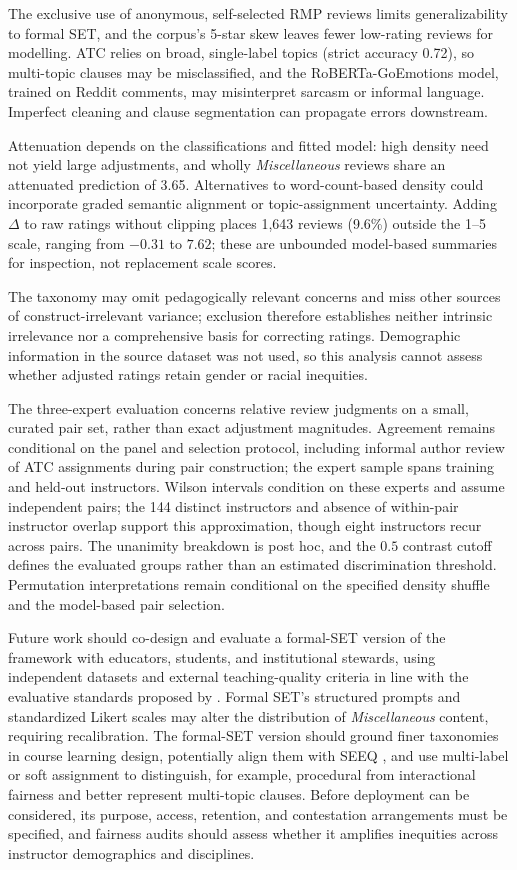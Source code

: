 \documentclass[fleqn,10pt]{JLA_article}
\let\cite\shortcite
\let\citeA\shortciteA
\begin{document}
The exclusive use of anonymous, self-selected RMP reviews limits generalizability to formal SET, and the corpus’s 5-star skew leaves fewer low-rating reviews for modelling. ATC relies on broad, single-label topics (strict accuracy 0.72), so multi-topic clauses may be misclassified, and the RoBERTa-GoEmotions model, trained on Reddit comments, may misinterpret sarcasm or informal language. Imperfect cleaning and clause segmentation can propagate errors downstream.

Attenuation depends on the classifications and fitted model: high density need not yield large adjustments, and wholly \textit{Miscellaneous} reviews share an attenuated prediction of 3.65. Alternatives to word-count-based density could incorporate graded semantic alignment or topic-assignment uncertainty. Adding $\Delta$ to raw ratings without clipping places 1,643 reviews (9.6\%) outside the 1--5 scale, ranging from $-0.31$ to $7.62$; these are unbounded model-based summaries for inspection, not replacement scale scores.

The taxonomy may omit pedagogically relevant concerns and miss other sources of construct-irrelevant variance; exclusion therefore establishes neither intrinsic irrelevance nor a comprehensive basis for correcting ratings. Demographic information in the source dataset was not used, so this analysis cannot assess whether adjusted ratings retain gender or racial inequities.

The three-expert evaluation concerns relative review judgments on a small, curated pair set, rather than exact adjustment magnitudes. Agreement remains conditional on the panel and selection protocol, including informal author review of ATC assignments during pair construction; the expert sample spans training and held-out instructors. Wilson intervals condition on these experts and assume independent pairs; the 144 distinct instructors and absence of within-pair instructor
overlap support this approximation, though eight instructors recur across pairs. The unanimity breakdown is post hoc, and the $0.5$ contrast cutoff defines the evaluated groups rather than an estimated discrimination threshold. Permutation interpretations remain conditional on the specified density shuffle and the model-based pair selection.

Future work should co-design and evaluate a formal-SET version of the framework with educators, students, and institutional stewards, using independent datasets and external teaching-quality criteria in line with the evaluative standards proposed by \citeA{FergusonClow2017}. Formal SET's structured prompts and standardized Likert scales may alter the distribution of \textit{Miscellaneous} content, requiring recalibration. The formal-SET version should ground finer taxonomies in course learning design, potentially align them with SEEQ \cite{Marsh1982}, and use multi-label or soft assignment to distinguish, for example, procedural from interactional fairness and better represent multi-topic clauses. Before deployment can be considered, its purpose, access, retention, and contestation arrangements must be specified, and fairness audits should assess whether it amplifies inequities across instructor demographics and disciplines.
\end{document}
